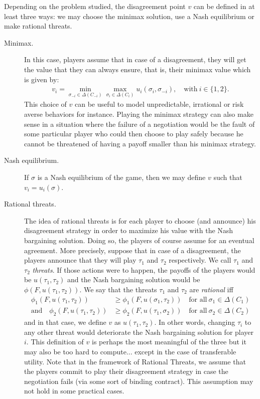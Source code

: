 Depending on the problem studied, the disagreement point $v$ can be defined in at least three ways: we may choose the minimax solution, use a Nash equilibrium or make rational threats.

\begin{description}
	\item[Minimax.] In this case, players assume that in case of a disagreement, they will get the value that they can always ensure, that is, their minimax value which is given by:
	\begin{align*}
		v_i = \min_{\sigma_{-i} \in \Delta(C_{-i})} \max_{\sigma_i \in \Delta(C_i)} u_i(\sigma_i, \sigma_{-i}), \quad \text{with} \ i \in \{1,2\}.
	\end{align*}
	This choice of $v$ can be useful to model unpredictable, irrational or risk averse behaviors for instance. Playing the minimax strategy can also make sense in a situation where the failure of a negotiation would be the fault of some particular player who could then choose to play safely because he cannot be threatened of having a payoff smaller than his minimax strategy.
	\item[Nash equilibrium.] If $\sigma$ is a Nash equilibrium of the game, then we may define $v$ such that $v_i = u_i(\sigma)$.
	\item[Rational threats.] The idea of rational threats is for each player to choose (and announce) his disagreement strategy in order to maximize his value with the Nash bargaining solution. Doing so, the players of course assume for an eventual agreement. More precisely, suppose that in case of a disagreement, the players announce that they will play $\tau_1$ and $\tau_2$ respectively. We call $\tau_1$ and $\tau_2$ \emph{threats}. If those actions were to happen, the payoffs of the players would be $u(\tau_1, \tau_2)$ and the Nash bargaining solution would be $\phi(F, u(\tau_1, \tau_2))$. We say that the threats $\tau_1$ and $\tau_2$ are \emph{rational} iff
	\begin{align*}
		\phi_1(F, u(\tau_1, \tau_2)) &\geq \phi_1(F, u(\sigma_1, \tau_2)) \quad \text{for all} \ \sigma_1 \in \Delta(C_1)\\
		\text{and} \quad \phi_2(F, u(\tau_1, \tau_2)) &\geq \phi_2(F, u(\tau_1, \sigma_2)) \quad \text{for all} \ \sigma_2 \in \Delta(C_2)
	\end{align*}
	and in that case, we define $v$ as $u(\tau_1, \tau_2)$. In other words, changing $\tau_i$ to any other threat would deteriorate the Nash bargaining solution for player $i$. This definition of $v$ is perhaps the most meaningful of the three but it may also be too hard to compute... except in the case of transferable utility. Note that in the framework of Rational Threats, we assume that the players commit to play their disagreement strategy in case the negotiation fails (via some sort of binding contract).  This assumption may not hold in some practical cases.
\end{description}



